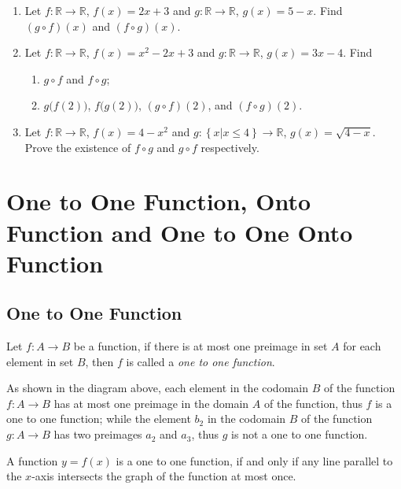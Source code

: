 \documentclass[12pt]{report}
\begin{document}
\begin{multicols}{2}

  \begin{enumerate}[label=\arabic*., leftmargin=*]
    \item Let $f: \mathbb{R} \to \mathbb{R}$, $f(x) = 2x + 3$ and $g: \mathbb{R} \to
            \mathbb{R}$, $g(x) = 5 - x$. Find $(g \circ f)(x)$ and $(f \circ g)(x)$.

    \item Let $f: \mathbb{R} \to \mathbb{R}$, $f(x) = x^2 - 2x + 3$ and $g: \mathbb{R}
            \to \mathbb{R}$, $g(x) = 3x - 4$. Find
          \begin{enumerate}
            \item $g \circ f$ and $f \circ g$;
            \item $g\big(f(2)\big)$, $f\big(g(2)\big)$, $(g \circ f)(2)$, and $(f \circ g)(2)$.
          \end{enumerate}

    \item Let $f: \mathbb{R} \to \mathbb{R}$, $f(x) = 4 - x^2$ and $g: \left\{x | x \leq
            4 \right\} \to \mathbb{R}$, $g(x) = \sqrt{4 - x}$. Prove the existence of $f
            \circ g$ and $g \circ f$ respectively.
  \end{enumerate}

\end{multicols}

\section{One to One Function, Onto Function and One to One Onto Function}

\subsection*{One to One Function}

Let $f: A \to B$ be a function, if there is at most one preimage in set $A$ for
each element in set $B$, then $f$ is called a \emph{one to one function}.

As shown in the diagram above, each element in the codomain $B$ of the function
$f: A \to B$ has at most one preimage in the domain $A$ of the function, thus
$f$ is a one to one function; while the element $b_2$ in the codomain $B$ of
the function $g: A \to B$ has two preimages $a_2$ and $a_3$, thus $g$ is not a
one to one function.

A function $y = f(x)$ is a one to one function, if and only if any line
parallel to the $x$-axis intersects the graph of the function at most once.
\end{document}

